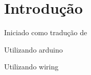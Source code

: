 \chapter{Introdução}

Iniciado como tradução de \cite{ItpPhysicalComputing}

Utilizando arduino \cite{SiteArduino}

Utilizando wiring \cite{SiteWiring}
